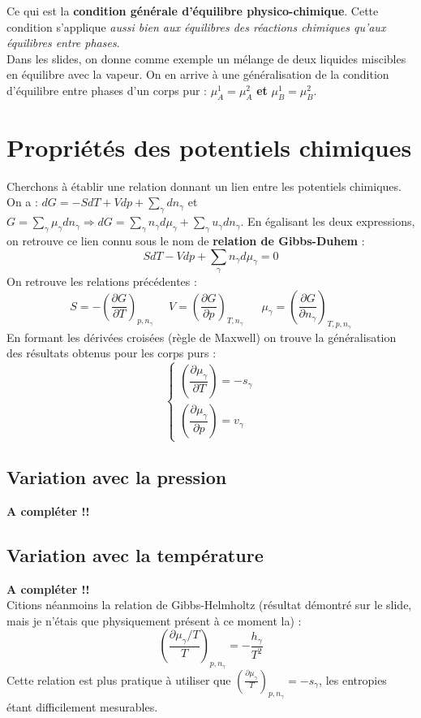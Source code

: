 \documentclass[11pt, a4paper, openany]{book}
\begin{document}
		Ce qui est la \textbf{condition générale d'équilibre physico-chimique}. Cette condition s'applique \textit{aussi bien aux équilibres des réactions chimiques qu'aux équilibres entre phases}.\\
		
		Dans les slides, on donne comme exemple un mélange de deux liquides miscibles en équilibre avec la vapeur. On en arrive à une généralisation de la condition d'équilibre entre phases d'un corps pur : $\mu_A^1 = \mu_A^2$ \textbf{et} $\mu_B^1 = \mu_B^2$.
		
		\section{Propriétés des potentiels chimiques}
		Cherchons à établir une relation donnant un lien entre les potentiels chimiques. On a : $dG = -S dT + V dp + \sum_\gamma dn_\gamma$ et $G = \sum_\gamma \mu_\gamma dn_\gamma \Rightarrow dG = \sum_\gamma n_\gamma d\mu_\gamma + \sum_\gamma u_\gamma dn_\gamma$. En égalisant les deux expressions, on retrouve ce lien connu sous le nom de \textbf{relation de Gibbs-Duhem} :
		\begin{equation}
			SdT - Vdp + \sum_\gamma n_\gamma d\mu_\gamma = 0
		\end{equation}
		On retrouve les relations précédentes :
		\begin{equation}
			S = - \left(\frac{\partial G}{\partial T}\right)_{p, n_\gamma}\ \ \ \ \ \  V =  \left(\frac{\partial G}{\partial p}\right)_{T, n_\gamma}\ \ \ \ \ \ \ \mu_\gamma = \left(\frac{\partial G}{\partial n_\gamma}\right)_{T, p, n_\gamma}
		\end{equation}
		En formant les dérivées croisées (règle de Maxwell) on trouve la généralisation des résultats obtenus pour les corps purs :
		\begin{equation}
			\left\{\begin{array}{l}
			\left( \dfrac{\partial \mu_\gamma}{\partial T} \right) = -s_\gamma\\
			\left( \dfrac{\partial \mu_\gamma}{\partial p} \right) = v_\gamma
			\end{array}\right.
		\end{equation}
		\subsection{Variation avec la pression}
		\textbf{A compléter !!}
		
		\subsection{Variation avec la température}
		\textbf{A compléter !!}\\
		Citions néanmoins la relation de Gibbs-Helmholtz (résultat démontré sur le slide, mais je n'étais que physiquement présent à ce moment la) :
		\begin{equation}
			\left(\frac{\partial \mu_\gamma/T}{T}\right)_{p, n_\gamma} = -\frac{h_\gamma}{T^2}
		\end{equation}
		Cette relation est plus pratique à utiliser que $\left(\frac{\partial \mu_\gamma}{T}\right)_{p, n_\gamma} = -s_\gamma$, les entropies étant difficilement mesurables.
		
\end{document}
